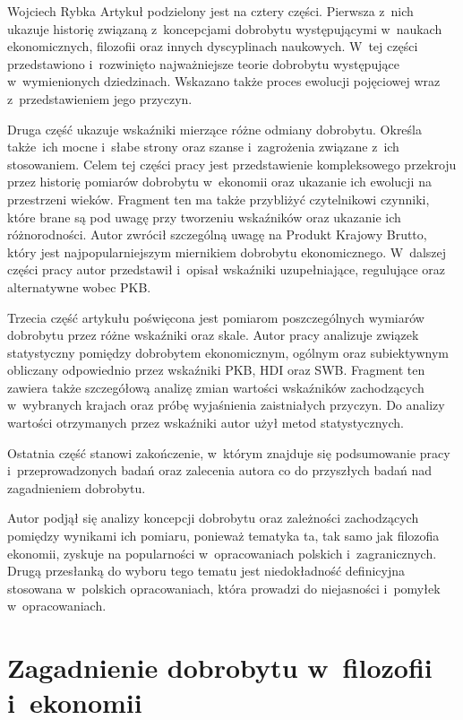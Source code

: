 \begin{artplenv}{Wojciech Rybka}
Artykuł podzielony jest na cztery części. Pierwsza z~nich ukazuje historię związaną z~koncepcjami dobrobytu występującymi
w~naukach ekonomicznych, filozofii oraz innych dyscyplinach naukowych. W~tej części przedstawiono i~rozwinięto
najważniejsze teorie dobrobytu występujące w~wymienionych dziedzinach. Wskazano także proces ewolucji pojęciowej
wraz z~przedstawieniem jego przyczyn.

Druga część ukazuje wskaźniki mierzące różne odmiany dobrobytu. Określa także~ich mocne i~słabe strony oraz
szanse i~zagrożenia związane z~ich stosowaniem. Celem tej części pracy jest przedstawienie kompleksowego przekroju przez
historię pomiarów dobrobytu w~ekonomii oraz ukazanie ich ewolucji na przestrzeni wieków. Fragment ten ma także
przybliżyć czytelnikowi czynniki, które brane są pod uwagę przy tworzeniu wskaźników oraz ukazanie ich różnorodności.
Autor zwrócił szczególną uwagę na Produkt Krajowy Brutto, który jest najpopularniejszym miernikiem dobrobytu
ekonomicznego. W~dalszej części pracy autor przedstawił i~opisał wskaźniki uzupełniające, regulujące oraz alternatywne
wobec PKB.

Trzecia część artykułu poświęcona jest pomiarom poszczególnych wymiarów dobrobytu przez różne wskaźniki oraz skale.
Autor pracy analizuje związek statystyczny pomiędzy dobrobytem ekonomicznym, ogólnym oraz subiektywnym obliczany
odpowiednio przez wskaźniki PKB, HDI oraz SWB. Fragment ten zawiera także szczegółową analizę zmian wartości wskaźników
zachodzących w~wybranych krajach oraz próbę wyjaśnienia zaistniałych przyczyn. Do analizy wartości otrzymanych przez
wskaźniki autor użył metod statystycznych.

Ostatnia część stanowi zakończenie, w~którym znajduje się podsumowanie pracy  i~przeprowadzonych badań oraz zalecenia
autora co do przyszłych badań nad zagadnieniem dobrobytu.

Autor podjął się analizy koncepcji dobrobytu oraz zależności zachodzących pomiędzy wynikami ich pomiaru, ponieważ
tematyka ta, tak samo jak filozofia ekonomii, zyskuje na popularności w~opracowaniach polskich i~zagranicznych. Drugą
przesłanką do wyboru tego tematu jest niedokładność definicyjna stosowana w~polskich opracowaniach, która prowadzi do
niejasności i~pomyłek w~opracowaniach.

\section{Zagadnienie dobrobytu w~filozofii i~ekonomii}
\baselineskip

\end{artplenv}

